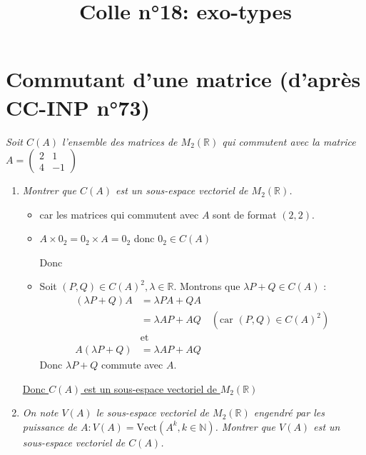 \documentclass[11pt]{article}
\title{Colle n°18: exo-types}
\date{}
\newcommand{\N}{\mathbb{N}}
\newcommand{\R}{\mathbb{R}}
\begin{document}
	
	\maketitle
	
	\section{Commutant d'une matrice (d'après CC-INP n°73)}
	
	{\large\textit{Soit \(C(A)\) l'ensemble des matrices de \(M_2(\R)\) qui commutent avec la matrice \(A = \begin{pmatrix}
				2 & 1\\ 4 & -1
			\end{pmatrix}\)}}
	
	\begin{enumerate}
		\item {\large\textit{Montrer que \(C(A)\) est un sous-espace vectoriel de \(M_2(\R)\).}}\\
		\begin{itemize}
			\renewcommand{\labelitemi}{$\circ$}
			\item \fbox{\(C(A) \subset M_2(\R)\)} car les matrices qui commutent avec \(A\) sont de format \((2,2)\).
			\item \(A \times 0_2 = 0_2 \times A = 0_2\) donc \(0_{2} \in C(A)\)
						
			Donc 
			
			\item Soit \((P, Q) \in C(A)^2, \lambda \in \R\). Montrons que \(\lambda P + Q \in C(A)\) :
			\begin{align*}
			(\lambda P + Q) A &= \lambda PA + QA\\
			&= \lambda A P + AQ \quad (\text{car } (P, Q) \in C(A)^2)\\
			&\text{et}\\
			A (\lambda P + Q) &= \lambda A P + A Q
			\end{align*}
			Donc \(\lambda P + Q\) commute avec \(A\). 
		\end{itemize}
		\underline{Donc \(C(A)\) est un sous-espace vectoriel de \(M_2(\R)\)}
		
		\medskip
		
		\item {\large\textit{On note \(V(A)\) le sous-espace vectoriel de \(M_2(\R)\) engendré par les puissance de \(A : V(A) = \text{Vect}(A^k, k \in \N)\). Montrer que \(V(A)\) est un sous-espace vectoriel de \(C(A)\).}}\\
		

\end{enumerate}
\end{document}

